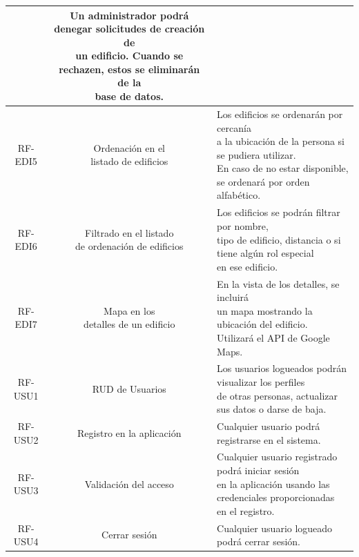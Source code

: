 \documentclass[12pt, a4paper, twoside]{article}
\begin{document}
{\begin{longtable}{ |c|c|l| }
    & \makecell[l]{Un administrador podrá denegar solicitudes de creación de \\
    un edificio. Cuando se rechazen, estos se eliminarán de la \\
    base de datos. 
    } \\ \hline
  RF-EDI5 & \makecell{Ordenación en el \\ listado de edificios}
  & \makecell[l]{Los edificios se ordenarán por cercanía \\
  a la ubicación de la persona si se pudiera utilizar. \\
  En caso de no estar disponible, se ordenará por orden \\
  alfabético. 
  }\\ \hline

  RF-EDI6 & \makecell{
  Filtrado en el listado \\
  de ordenación de edificios}
  & \makecell[l]{Los edificios se podrán filtrar por nombre, \\
  tipo de edificio, distancia o si tiene algún rol especial \\
  en ese edificio.
  } \\ \hline

  RF-EDI7 & \makecell{Mapa en los \\ detalles de un edificio}
  & \makecell[l]{En la vista de los detalles, se incluirá  \\
  un mapa mostrando la ubicación del edificio.\\
  Utilizará el API de Google Maps.
   } \\ \hline

  RF-USU1 & RUD de Usuarios 
  & \makecell[l]{Los usuarios logueados podrán visualizar los perfiles \\
  de otras personas, actualizar sus datos o darse de baja. 
  }\\ \hline
  RF-USU2 & Registro en la aplicación 
  & Cualquier usuario podrá registrarse en el sistema. 
  \\ \hline 
  RF-USU3 & Validación del acceso 
  & \makecell[l]{Cualquier usuario registrado podrá iniciar sesión \\
  en la aplicación usando las credenciales proporcionadas \\
  en el registro.
   } \\ \hline
  RF-USU4 & Cerrar sesión & Cualquier usuario logueado podrá cerrar sesión. \\ \hline



\end{longtable}}
\end{document}
